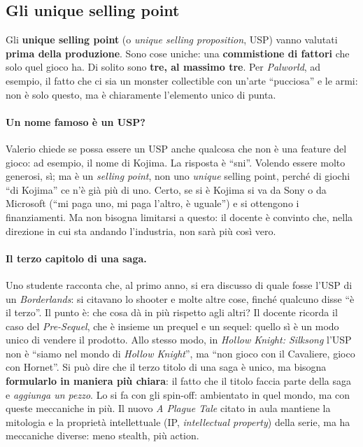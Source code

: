 \subsection{Gli unique selling point}

Gli \textbf{unique selling point} (o \emph{unique selling proposition},
USP) vanno valutati \textbf{prima della produzione}. Sono cose uniche: una
\textbf{commistione di fattori} che solo quel gioco ha. Di solito sono
\textbf{tre, al massimo tre}. Per \emph{Palworld}, ad esempio, il fatto che
ci sia un monster collectible con un'arte ``pucciosa'' e le armi: non è solo
questo, ma è chiaramente l'elemento unico di punta.

\paragraph{Un nome famoso è un USP?} Valerio chiede se possa essere un USP
anche qualcosa che non è una feature del gioco: ad esempio, il nome di
Kojima. La risposta è ``sni''. Volendo essere molto generosi, sì; ma è un
\emph{selling point}, non uno \emph{unique} selling point, perché di giochi
``di Kojima'' ce n'è già più di uno. Certo, se si è Kojima si va da Sony o da
Microsoft (``mi paga uno, mi paga l'altro, è uguale'') e si ottengono i
finanziamenti. Ma non bisogna limitarsi a questo: il docente è convinto che,
nella direzione in cui sta andando l'industria, non sarà più così vero.

\paragraph{Il terzo capitolo di una saga.} Uno studente racconta che, al primo
anno, si era discusso di quale fosse l'USP di un \emph{Borderlands}: si
citavano lo shooter e molte altre cose, finché qualcuno disse ``è il terzo''.
Il punto è: che cosa dà in più rispetto agli altri? Il docente ricorda il
caso del \emph{Pre-Sequel}, che è insieme un prequel e un sequel: quello sì è
un modo unico di vendere il prodotto. Allo stesso modo, in \emph{Hollow
Knight: Silksong} l'USP non è ``siamo nel mondo di \emph{Hollow Knight}'', ma
``non gioco con il Cavaliere, gioco con Hornet''. Si può dire che il terzo
titolo di una saga è unico, ma bisogna \textbf{formularlo in maniera più
chiara}: il fatto che il titolo faccia parte della saga e \emph{aggiunga un
pezzo}. Lo si fa con gli spin-off: ambientato in quel mondo, ma con queste
meccaniche in più. Il nuovo \emph{A Plague Tale} citato in aula mantiene la
mitologia e la proprietà intellettuale (IP, \emph{intellectual property}) della
serie, ma ha meccaniche diverse: meno stealth, più action.

